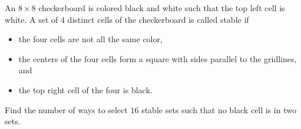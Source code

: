 An $8\times 8$ checkerboard is colored black and white such that the top left cell is white. A set of $4$ distinct cells of the checkerboard is called stable if

\begin{itemize}

\item the four cells are not all the same color,

\item the centers of the four cells form a square with sides parallel to the gridlines, and

\item the top right cell of the four is black.

\end{itemize}

Find the number of ways to select $16$ stable sets such that no black cell is in two sets.

